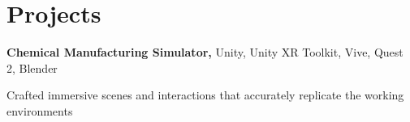 \section{Projects}
\begin{onecolentry}
\textbf{Chemical Manufacturing Simulator,} Unity, Unity XR Toolkit, Vive, Quest 2, Blender 
\end{onecolentry}

\vspace{0.10 cm}
\begin{onecolentry}
    \begin{highlights}
        \item Crafted immersive scenes and interactions that accurately replicate the working environments
    \end{highlights}
\end{onecolentry}